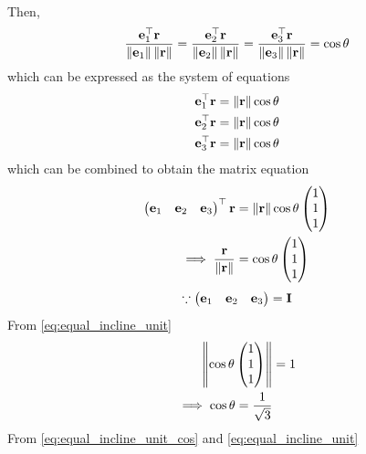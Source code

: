 \documentclass[journal,12pt,twocolumn]{IEEEtran}
\renewcommand\thesection{\arabic{section}}
\begin{document}
\begin{enumerate}[label=\thesection.\arabic*.,ref=\thesection.\theenumi]
\begin{align}
  \end{align}
  Then, 
  \begin{align}
	  \frac{\mathbf{e}_1^{\top} \mathbf{r}}{\left\lVert\mathbf{e}_1\right\rVert\left\lVert\mathbf{r}\right\rVert} = 
	  \frac{\mathbf{e}_2^{\top} \mathbf{r}}{\left\lVert\mathbf{e}_2\right\rVert\left\lVert\mathbf{r}\right\rVert} = 
	  \frac{\mathbf{e}_3^{\top} \mathbf{r}}{\left\lVert\mathbf{e}_3\right\rVert\left\lVert\mathbf{r}\right\rVert} = \cos \theta
  \end{align}
  which can be expressed as the system of equations
  \begin{align}
	  {\mathbf{e}_1^{\top} \mathbf{r}} = \left\lVert\mathbf{r}\right\rVert\cos \theta
	  \\
	  {\mathbf{e}_2^{\top} \mathbf{r}} = \left\lVert\mathbf{r}\right\rVert\cos \theta
	  \\
	  {\mathbf{e}_3^{\top} \mathbf{r}} = \left\lVert\mathbf{r}\right\rVert\cos \theta
  \end{align}
  which can be combined to obtain the matrix equation
  \begin{align}
	  \begin{pmatrix}\mathbf{e}_1 & \mathbf{e}_2 & \mathbf{e}_3\end{pmatrix}^{\top}\mathbf{r} &= \left\lVert\mathbf{r}\right\rVert\cos \theta \begin{pmatrix}1\\1\\1\end{pmatrix}
	  \\
	  \implies \frac{\mathbf{r}}{\left\lVert\mathbf{r}\right\rVert}&= \cos \theta \begin{pmatrix}1\\1\\1\end{pmatrix}
	  \label{eq:equal_incline_unit}
  \end{align}
  \begin{align}
	  \because 	\begin{pmatrix}\mathbf{e}_1 & \mathbf{e}_2 & \mathbf{e}_3\end{pmatrix} = \mathbf{I}
  \end{align}
  From 
	  \eqref{eq:equal_incline_unit}
  \begin{align}
	  \left\lVert\cos \theta \begin{pmatrix}1\\1\\1\end{pmatrix}\right\rVert &= 1
	  \\
	  \implies\cos \theta  = \frac{1}{\sqrt{3}}
	  \label{eq:equal_incline_unit_cos}
  \end{align}
 From  
	  \eqref{eq:equal_incline_unit_cos} and 
	  \eqref{eq:equal_incline_unit}


\end{enumerate}
\end{document}
